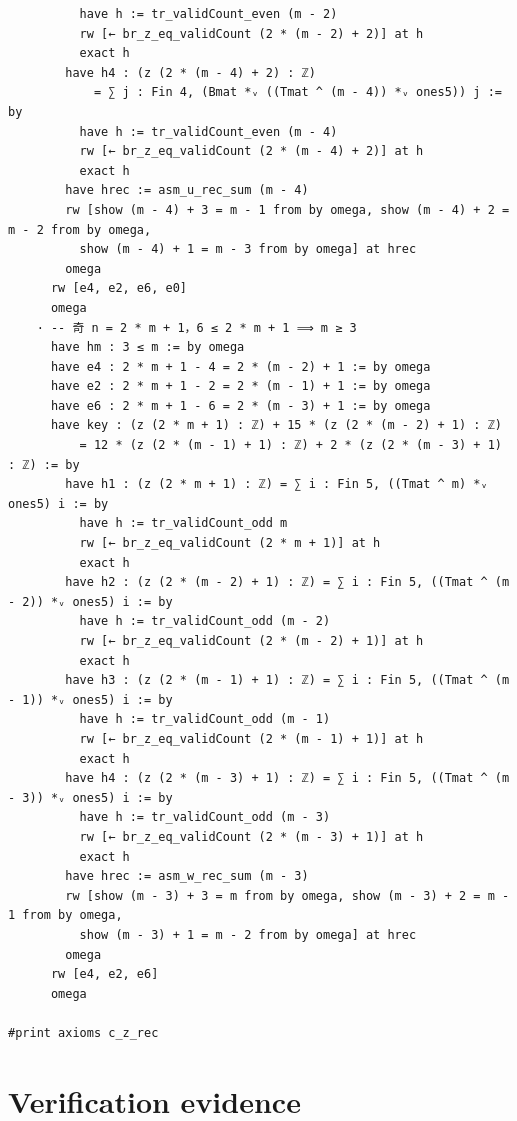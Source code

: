 \documentclass[11pt]{article}
\begin{document}
\begin{lstlisting}
          have h := tr_validCount_even (m - 2)
          rw [← br_z_eq_validCount (2 * (m - 2) + 2)] at h
          exact h
        have h4 : (z (2 * (m - 4) + 2) : ℤ)
            = ∑ j : Fin 4, (Bmat *ᵥ ((Tmat ^ (m - 4)) *ᵥ ones5)) j := by
          have h := tr_validCount_even (m - 4)
          rw [← br_z_eq_validCount (2 * (m - 4) + 2)] at h
          exact h
        have hrec := asm_u_rec_sum (m - 4)
        rw [show (m - 4) + 3 = m - 1 from by omega, show (m - 4) + 2 = m - 2 from by omega,
          show (m - 4) + 1 = m - 3 from by omega] at hrec
        omega
      rw [e4, e2, e6, e0]
      omega
    · -- 奇 n = 2 * m + 1，6 ≤ 2 * m + 1 ⟹ m ≥ 3
      have hm : 3 ≤ m := by omega
      have e4 : 2 * m + 1 - 4 = 2 * (m - 2) + 1 := by omega
      have e2 : 2 * m + 1 - 2 = 2 * (m - 1) + 1 := by omega
      have e6 : 2 * m + 1 - 6 = 2 * (m - 3) + 1 := by omega
      have key : (z (2 * m + 1) : ℤ) + 15 * (z (2 * (m - 2) + 1) : ℤ)
          = 12 * (z (2 * (m - 1) + 1) : ℤ) + 2 * (z (2 * (m - 3) + 1) : ℤ) := by
        have h1 : (z (2 * m + 1) : ℤ) = ∑ i : Fin 5, ((Tmat ^ m) *ᵥ ones5) i := by
          have h := tr_validCount_odd m
          rw [← br_z_eq_validCount (2 * m + 1)] at h
          exact h
        have h2 : (z (2 * (m - 2) + 1) : ℤ) = ∑ i : Fin 5, ((Tmat ^ (m - 2)) *ᵥ ones5) i := by
          have h := tr_validCount_odd (m - 2)
          rw [← br_z_eq_validCount (2 * (m - 2) + 1)] at h
          exact h
        have h3 : (z (2 * (m - 1) + 1) : ℤ) = ∑ i : Fin 5, ((Tmat ^ (m - 1)) *ᵥ ones5) i := by
          have h := tr_validCount_odd (m - 1)
          rw [← br_z_eq_validCount (2 * (m - 1) + 1)] at h
          exact h
        have h4 : (z (2 * (m - 3) + 1) : ℤ) = ∑ i : Fin 5, ((Tmat ^ (m - 3)) *ᵥ ones5) i := by
          have h := tr_validCount_odd (m - 3)
          rw [← br_z_eq_validCount (2 * (m - 3) + 1)] at h
          exact h
        have hrec := asm_w_rec_sum (m - 3)
        rw [show (m - 3) + 3 = m from by omega, show (m - 3) + 2 = m - 1 from by omega,
          show (m - 3) + 1 = m - 2 from by omega] at hrec
        omega
      rw [e4, e2, e6]
      omega

#print axioms c_z_rec
\end{lstlisting}

\section{Verification evidence}\label{sec:verify}
\end{document}

